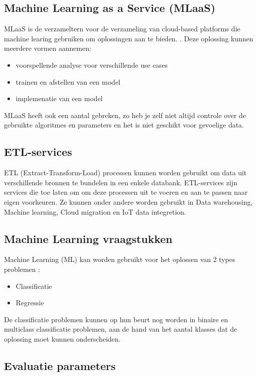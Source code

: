 \subsection{Machine Learning as a Service (MLaaS)}
MLaaS is de verzameltern voor de verzameling van cloud-based platforms die machine learing gebruiken om oplossingen aan te bieden. \autocite{Onose2022}. Deze oplossing kunnen meerdere vormen aannemen: 
\begin{itemize}
    \item voorspellende analyse voor verschillende use cases
    \item trainen en afstellen van een model
    \item implemenatie van een model
\end{itemize}

MLaaS heeft ook een aantal gebreken, zo heb je zelf niet altijd controle over de gebruikte algoritmes en parameters en het is niet geschikt voor gevoelige data.

\subsection{ETL-services}
ETL (Extract-Transform-Load)  processen kunnen worden gebruikt om data uit verschillende bronnen te bundelen in een enkele databank. ETL-services zijn services die toe laten om om deze processen uit te voeren en aan te passen naar eigen voorkeuren. Ze kunnen onder andere worden gebruikt in Data warehousing, Machine learning, Cloud migration en IoT data integretion. \autocite{Diouf2018}

\subsection{Machine Learning vraagstukken}
Machine Learning (ML) kan worden gebruikt voor het oplossen van 2 types problemen : 
\begin{itemize}
    \item Classificatie
    \item Regressie
\end{itemize}  

De classificatie problemen kunnen op hun beurt nog worden in binaire en multiclass classificatie problemen, aan de hand van het aantal klasses dat de oplossing moet kunnen onderscheiden.  \autocite{Olugbenga2022}
\subsection{Evaluatie parameters}
